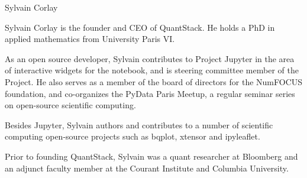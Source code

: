 \begin{participant}[type=leadPI,PM=6,gender=male]{Sylvain Corlay}

  Sylvain Corlay is the founder and CEO of QuantStack. He holds a PhD in applied mathematics from University Paris VI.

  As an open source developer, Sylvain contributes to Project Jupyter in the area of interactive widgets for the notebook, and is steering committee member of the Project. He also serves as a member of the board of directors for the NumFOCUS foundation, and co-organizes the PyData Paris Meetup, a regular seminar series on open-source scientific computing.

  Besides Jupyter, Sylvain authors and contributes to a number of scientific computing open-source projects such as bqplot, xtensor and ipyleaflet.

  Prior to founding QuantStack, Sylvain was a quant researcher at Bloomberg and an adjunct faculty member at the Courant Institute and Columbia University.
\end{participant}

